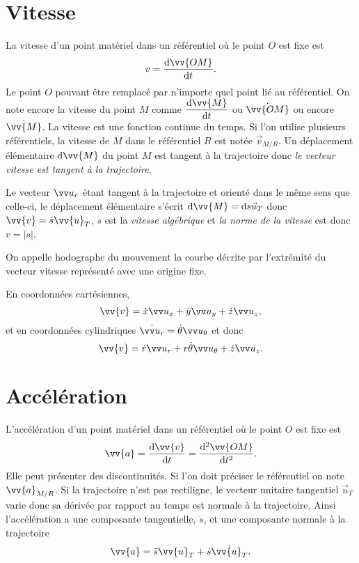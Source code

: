 \section{Vitesse}
\label{chap1-sec:vitesse}

La vitesse d'un point matériel dans un référentiel où le point \(O\) est fixe est
\begin{equation}
  v = \derived{\vv{OM}}{t}.
\end{equation}
Le point \(O\) pouvant être remplacé par n'importe quel point lié au référentiel. On note encore la vitesse du point \(M\) comme \(\derived{\vv{M}}{t}\) ou \(\dot{\vv{OM}}\) ou encore \(\dot{\vv{M}}\). La vitesse est une fonction continue du temps. Si l'on utilise plusieurs référentiels, la vitesse de \(M\) dans le référentiel \(R\) est notée \(\vec{v}_{M/R}\). Un déplacement élémentaire \(\D \vv{M}\) du point \(M\) est tangent à la trajectoire donc \emph{le vecteur vitesse est tangent à la trajectoire}.

Le vecteur \(\ur\) étant tangent à la trajectoire et orienté dans le même sens que celle-ci, le déplacement élémentaire s'écrit \(\D \vv{M}=\D s \vec{u}_T\) donc \(\vv{v}=\dot{s} \vv{u}_T\), \(\dot{s}\) est la \emph{vitesse algébrique} et \emph{la norme de la vitesse} est donc \(v=|\dot{s}|\).

On appelle hodographe du mouvement la courbe décrite par l'extrémité du vecteur vitesse représenté avec une origine fixe.

En coordonnées cartésiennes,
\begin{equation}
  \vv{v} = \dot{x}\ux+\dot{y}\uy+\dot{z}\uz,
\end{equation}
et en coordonnées cylindriques \(\dot{\ur}=\dot{\theta}\utheta\) et donc
\begin{equation}
  \vv{v}=\dot{r}\ur+r\dot{\theta}\utheta+\dot{z}\uz.
\end{equation}

\section{Accélération}
\label{chap1-sec:accélération}

L'accélération d'un point matériel dans un référentiel où le point \(O\) est fixe est
\begin{equation}
  \vv{a}=\derived{\vv{v}}{t}=\deriveds{\vv{OM}}{t}.
\end{equation}
Elle peut présenter des discontinuités. Si l'on doit préciser le référentiel on note \(\vv{a}_{M/R}\). Si la trajectoire n'est pas rectiligne, le vecteur unitaire tangentiel \(\vec{u}_T\) varie donc sa dérivée par rapport au temps est normale à la trajectoire. Ainsi l'accélération a une composante tangentielle, \(\ddot{s}\), et une composante normale à la trajectoire
\begin{equation}
  \vv{a}=\ddot{s}\vv{u}_T + \dot{s}\dot{\vv{u}_T}.
\end{equation}

